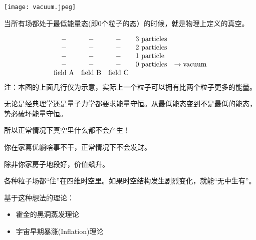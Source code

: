 \documentclass[CJK]{beamer}
\begin{document}
\begin{frame}
\bch
\begin{minipage}{0.35\textwidth}
\texttt{[image: vacuum.jpeg]}
\end{minipage}\begin{minipage}{0.55\textwidth}
当所有场都处于最低能量态(即0个粒子的态）的时候，就是物理上定义的真空。
\end{minipage}

\skipline
\begin{equation}
\begin{array}{ccclr}
- & - & - & \mathrm{3\ particles} &\\
- & - & - & \mathrm{2\ particles}&\\
- & - & - & \mathrm{1\ particle} &\\
- & - & - & \mathrm{0\ particles}& \rightarrow {\bf \rm vacuum}\\ 
{\rm field\ A} & {\rm field\ B} & {\rm field\ C}
\end{array} \nonumber
\end{equation}
{\scriptsize
注：本图的上面几行仅为示意，实际上一个粒子可以拥有比两个粒子更多的能量。
}

\ech
\end{frame}

\begin{frame}
\bch

无论是经典理学还是量子力学都要求能量守恒。从最低能态变到不是最低的能态，势必破坏能量守恒。

\skipline
所以正常情况下真空里什么都不会产生！

\ech
\end{frame}

\begin{frame}
\bch

你在家葛优躺啥事不干，正常情况下不会发财。

\ech
\end{frame}


\begin{frame}
\bch
除非你家房子地段好，价值飙升。
\ech
\end{frame}

\begin{frame}
\bch
各种粒子场都“住”在四维时空里。如果时空结构发生剧烈变化，就能“无中生有”。

\skipline

基于这种想法的理论：
\begin{itemize}
\item{霍金的黑洞蒸发理论}
\item{宇宙早期暴涨(Inflation)理论}
\end{itemize}
\ech
\end{frame}
\end{document}
